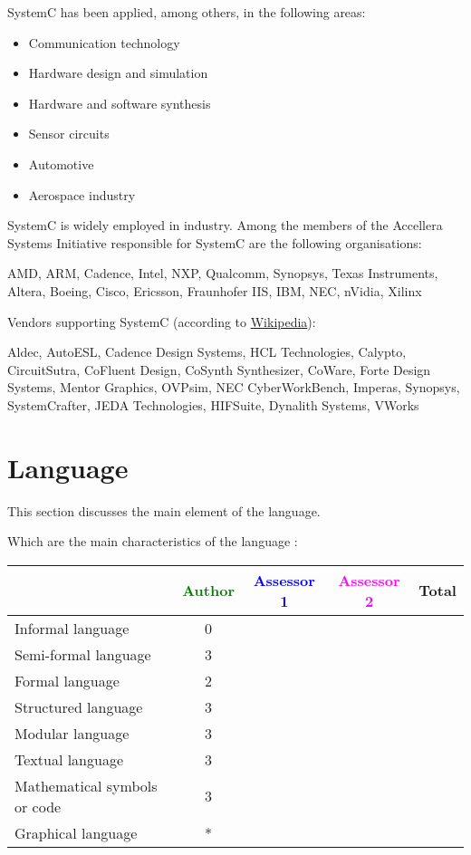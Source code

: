 SystemC has been applied, among others, in the following areas:

\begin{itemize}
	\item Communication technology
	\item Hardware design and simulation
	\item Hardware and software synthesis
	\item Sensor circuits
	\item Automotive
	\item Aerospace industry
\end{itemize}

SystemC is widely employed in industry. Among the members of the Accellera Systems Initiative responsible for SystemC are the following organisations:

AMD, ARM, Cadence, Intel, NXP, Qualcomm, Synopsys, Texas Instruments, Altera, Boeing, Cisco, Ericsson, Fraunhofer IIS, IBM, NEC, nVidia, Xilinx

Vendors supporting SystemC (according to \href{http://en.wikipedia.org/wiki/SystemC}{Wikipedia}):

Aldec, AutoESL, Cadence Design Systems, HCL Technologies, Calypto, CircuitSutra, CoFluent Design, CoSynth Synthesizer, CoWare, Forte Design Systems, Mentor Graphics, OVPsim, NEC CyberWorkBench, Imperas, Synopsys, SystemCrafter, JEDA Technologies, HIFSuite, Dynalith Systems, VWorks


\section{Language}
This section discusses the main element of the language.

Which are the main characteristics of the language :

\begin{tabular}{|l | c | c | c | c|}
\hline
& \textcolor{green}{Author} & \textcolor{blue}{Assessor 1} & \textcolor{magenta}{Assessor 2} & Total \\
\hline 
Informal language &0 & & &  \\
\hline 
Semi-formal language &3 & & &  \\
\hline
Formal language &2 & & &  \\
\hline
Structured language &3 & & & \\
\hline
Modular language &3 & & & \\
\hline
Textual language &3 & & & \\
\hline
Mathematical symbols or code &3 & & & \\
\hline
Graphical language &* & & & \\
\hline
\end{tabular}

